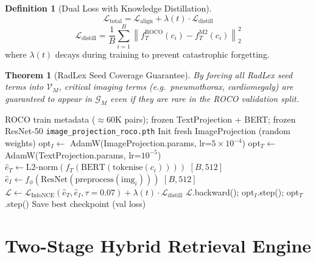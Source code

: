 \documentclass[12pt,a4paper]{article}
\theoremstyle{definition}
\newtheorem{definition}{Definition}[section]
\theoremstyle{plain}
\newtheorem{theorem}{Theorem}[section]
\theoremstyle{remark}
\newcommand{\Norm}[1]{\left\|#1\right\|}
\newcommand{\KG}{\mathcal{G}}
\begin{document}
\begin{definition}[Dual Loss with Knowledge Distillation]
\[
  \mathcal{L}_{\text{total}} = \mathcal{L}_{\text{align}} + \lambda(t) \cdot \mathcal{L}_{\text{distill}}
\]
\[
  \mathcal{L}_{\text{distill}} = \frac{1}{B}\sum_{i=1}^B \Norm{f_T^{\text{ROCO}}(c_i) - f_T^{\text{M2}}(c_i)}_2^2
\]
where $\lambda(t)$ decays during training to prevent catastrophic forgetting.
\end{definition}

\begin{theorem}[RadLex Seed Coverage Guarantee]
By forcing all RadLex seed terms into $\mathcal{V}_M$, critical imaging terms (e.g.\ \emph{pneumothorax}, \emph{cardiomegaly}) are guaranteed to appear in $\KG_M$ even if they are rare in the ROCO validation split.
\end{theorem}

\begin{algorithm}[H]
\caption{Fine-tune ImageProjection for ROCO Medical Domain}
\label{alg:finetune_roco}
\begin{algorithmic}[1]
\Require ROCO train metadata ($\approx$60K pairs); frozen TextProjection + BERT; frozen ResNet-50
\Ensure \texttt{image\_projection\_roco.pth}
\State Init fresh ImageProjection (random weights)
\State opt$_I \gets$ AdamW(ImageProjection.params, lr=$5\times10^{-4}$)
\State opt$_T \gets$ AdamW(TextProjection.params, lr=$10^{-5}$) 
    \State $\hat{e}_T \gets \text{L2-norm}(f_T(\text{BERT}(\text{tokenise}(c_i))))$ \quad $[B,512]$
    \State $\hat{e}_I \gets f_\phi(\text{ResNet}(\text{preprocess}(\text{img}_i)))$ \quad $[B,512]$
    \State $\mathcal{L} \gets \mathcal{L}_{\text{InfoNCE}}(\hat{e}_T, \hat{e}_I, \tau{=}0.07) + \lambda(t)\cdot\mathcal{L}_{\text{distill}}$
    \State $\mathcal{L}$.backward(); opt$_I$.step(); opt$_T$.step()
  \EndFor
  \State Save best checkpoint (val loss)
\EndFor
\end{algorithmic}
\end{algorithm}

\newpage
\section{Two-Stage Hybrid Retrieval Engine}
\label{sec:retrieval}
\end{document}
